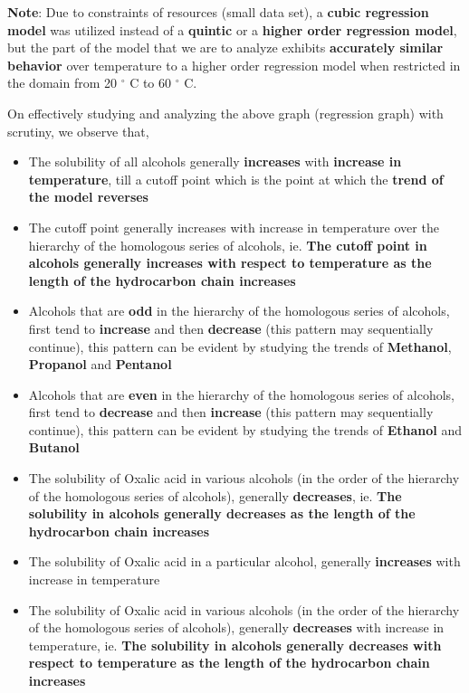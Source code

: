 {\textbf{Note}: Due to constraints of resources (small data set), a \textbf{cubic regression model} was utilized instead of a \textbf{quintic} or a \textbf{higher order regression model}, but the part of the model that we are to analyze exhibits \textbf{accurately similar behavior} over temperature to a higher order regression model when restricted in the domain from 20 $^\circ$ C to 60 $^\circ$ C.}

{On effectively studying and analyzing the above graph (regression graph) with scrutiny, we observe that,}

	\begin{itemize}
		\item {The solubility of all alcohols generally \textbf{increases} with \textbf{increase in temperature}, till a cutoff point which is the point at which the \textbf{trend of the model reverses}}
		\item {The cutoff point generally increases with increase in temperature over the hierarchy of the homologous series of alcohols, ie. \textbf{The cutoff point in alcohols generally increases with respect to temperature as the length of the hydrocarbon chain increases}}
		\item {Alcohols that are \textbf{odd} in the hierarchy of the homologous series of alcohols, first tend to \textbf{increase} and then \textbf{decrease} (this pattern may sequentially continue), this pattern can be evident by studying the trends of \textbf{Methanol}, \textbf{Propanol} and \textbf{Pentanol}}
		\item {Alcohols that are \textbf{even} in the hierarchy of the homologous series of alcohols, first tend to \textbf{decrease} and then \textbf{increase} (this pattern may sequentially continue), this pattern can be evident by studying the trends of \textbf{Ethanol} and \textbf{Butanol}}
		\item {The solubility of Oxalic acid in various alcohols (in the order of the hierarchy of the homologous series of alcohols), generally \textbf{decreases}, ie. \textbf{The solubility in alcohols generally decreases as the length of the hydrocarbon chain increases}}
		\item {The solubility of Oxalic acid in a particular alcohol, generally \textbf{increases} with increase in temperature}
		\item {The solubility of Oxalic acid in various alcohols (in the order of the hierarchy of the homologous series of alcohols), generally \textbf{decreases} with increase in temperature, ie. \textbf{The solubility in alcohols generally decreases with respect to temperature as the length of the hydrocarbon chain increases}}
	\end{itemize}

